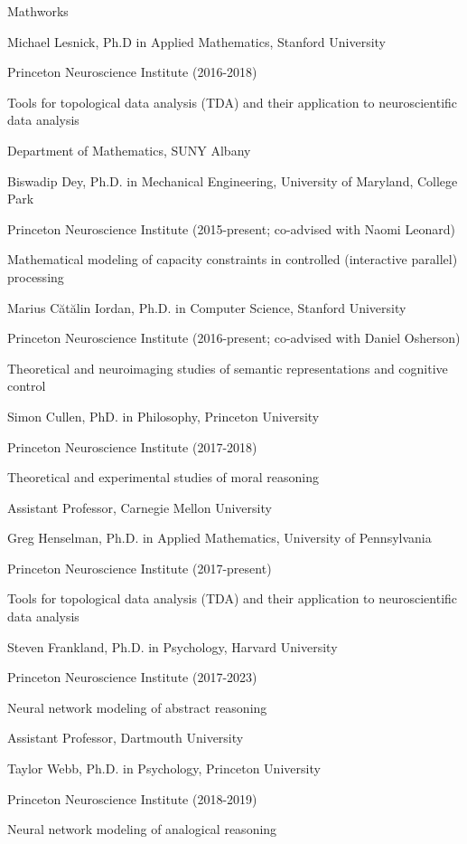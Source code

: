 \documentclass[10 pt]{article}
\begin{document}
Mathworks
    \medskip

Michael Lesnick, Ph.D in Applied Mathematics, Stanford University

Princeton Neuroscience Institute (2016-2018)

Tools for topological data analysis (TDA) and their application to neuroscientific data analysis

Department of Mathematics, SUNY Albany
    \medskip

Biswadip Dey, Ph.D. in Mechanical Engineering, University of Maryland, College Park

Princeton Neuroscience Institute (2015-present; co-advised with Naomi Leonard)

Mathematical modeling of capacity constraints in controlled (interactive parallel) processing
    \medskip

Marius Cătălin Iordan, Ph.D. in Computer Science, Stanford University

Princeton Neuroscience Institute (2016-present; co-advised with Daniel Osherson)

Theoretical and neuroimaging studies of semantic representations and cognitive control
    \medskip

Simon Cullen, PhD. in Philosophy, Princeton University

Princeton Neuroscience Institute (2017-2018)

Theoretical and experimental studies of moral reasoning

Assistant Professor, Carnegie Mellon University
    \medskip

Greg Henselman, Ph.D. in Applied Mathematics, University of Pennsylvania

Princeton Neuroscience Institute (2017-present)

Tools for topological data analysis (TDA) and their application to neuroscientific data analysis
    \medskip

Steven Frankland, Ph.D. in Psychology, Harvard University

Princeton Neuroscience Institute (2017-2023)

Neural network modeling of abstract reasoning

Assistant Professor, Dartmouth University
    \medskip

Taylor Webb, Ph.D. in Psychology, Princeton University

Princeton Neuroscience Institute (2018-2019)

Neural network modeling of analogical reasoning
    \medskip
\end{document}
